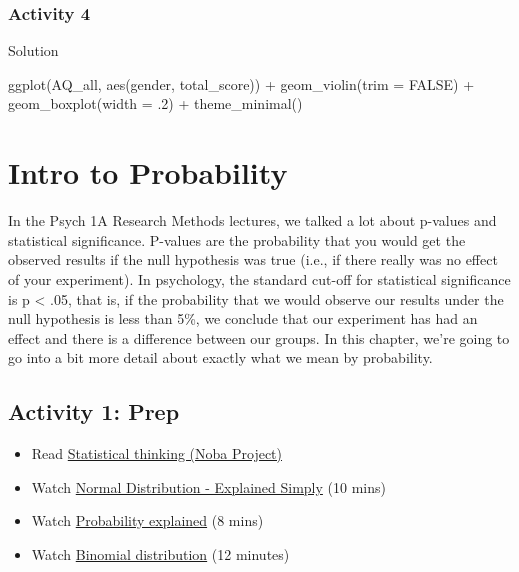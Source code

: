\documentclass[
  oneside]{book}
\newenvironment{Shaded}{\begin{snugshade}}{\end{snugshade}}
\newcommand{\AttributeTok}[1]{\textcolor[rgb]{0.77,0.63,0.00}{#1}}
\newcommand{\ConstantTok}[1]{\textcolor[rgb]{0.00,0.00,0.00}{#1}}
\newcommand{\DecValTok}[1]{\textcolor[rgb]{0.00,0.00,0.81}{#1}}
\newcommand{\FunctionTok}[1]{\textcolor[rgb]{0.00,0.00,0.00}{#1}}
\newcommand{\NormalTok}[1]{#1}
\newcommand{\SpecialCharTok}[1]{\textcolor[rgb]{0.00,0.00,0.00}{#1}}
\providecommand{\tightlist}{%
  \setlength{\itemsep}{0pt}\setlength{\parskip}{0pt}}
\begin{document}
\hypertarget{activity-4-4}{%
\subsection{Activity 4}\label{activity-4-4}}

Solution

\begin{Shaded}
\begin{Highlighting}[]
\FunctionTok{ggplot}\NormalTok{(AQ\_all, }\FunctionTok{aes}\NormalTok{(gender, total\_score)) }\SpecialCharTok{+}
  \FunctionTok{geom\_violin}\NormalTok{(}\AttributeTok{trim =} \ConstantTok{FALSE}\NormalTok{) }\SpecialCharTok{+}
  \FunctionTok{geom\_boxplot}\NormalTok{(}\AttributeTok{width =}\NormalTok{ .}\DecValTok{2}\NormalTok{) }\SpecialCharTok{+}
  \FunctionTok{theme\_minimal}\NormalTok{()}
\end{Highlighting}
\end{Shaded}

\hypertarget{intro-to-probability}{%
\chapter{Intro to Probability}\label{intro-to-probability}}

In the Psych 1A Research Methods lectures, we talked a lot about p-values and statistical significance. P-values are the probability that you would get the observed results if the null hypothesis was true (i.e., if there really was no effect of your experiment). In psychology, the standard cut-off for statistical significance is p \textless{} .05, that is, if the probability that we would observe our results under the null hypothesis is less than 5\%, we conclude that our experiment has had an effect and there is a difference between our groups. In this chapter, we're going to go into a bit more detail about exactly what we mean by probability.

\hypertarget{activity-1-prep}{%
\section{Activity 1: Prep}\label{activity-1-prep}}

\begin{itemize}
\tightlist
\item
  Read \href{https://nobaproject.com/modules/statistical-thinking\#content}{Statistical thinking (Noba Project)}
\item
  Watch \href{https://www.youtube.com/watch?v=tDLcBrLzBos}{Normal Distribution - Explained Simply} (10 mins)
\item
  Watch \href{https://www.youtube.com/watch?v=uzkc-qNVoOk\&list=PLC58778F28211FA19}{Probability explained} (8 mins)
\item
  Watch \href{https://www.youtube.com/watch?v=WWv0RUxDfbs}{Binomial distribution} (12 minutes)
\end{itemize}
\end{document}

